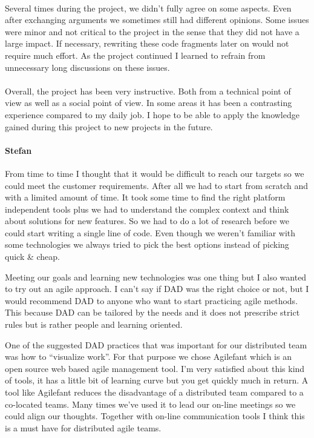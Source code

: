 \paragraph{}
Several times during the project, we didn't fully agree on some aspects.
Even after exchanging arguments we sometimes still had different opinions.
Some issues were minor and not critical to the project in the sense that
they did not have a large impact. If necessary, rewriting these code fragments
later on would not require much effort. As the project continued I
learned to refrain from unnecessary long discussions on these issues.



\paragraph{}
Overall, the project has been very instructive. Both from a technical point
of view as well as a social point of view. In some areas it has been a
contrasting experience compared to my daily job. I hope to be able to
apply the knowledge gained during this project to new projects in the future.




\paragraph{Stefan}
From time to time I thought that it would be difficult to reach our targets so
we could meet the customer requirements. After all we had to start from scratch
and with a limited amount of time. It took some time to find the right platform
independent tools plus we had to understand the complex context and think about
solutions for new features. So we had to do a lot of research before we could
start writing a single line of code. Even though we weren't familiar with some
technologies we always tried to pick the best options instead of picking quick
\& cheap.

Meeting our goals and learning new technologies was one thing but I also wanted
to try out an agile approach. I can't say if DAD was the right choice or not,
but I would recommend DAD to anyone who want to start practicing agile methods.
This because DAD can be tailored by the needs and it does not prescribe strict
rules but is rather people and learning oriented.

One of the suggested DAD practices that was important for our distributed team
was how to ``visualize work''. For that purpose we chose Agilefant which is an
open source web based agile management tool. I'm very satisfied about this kind
of tools, it has a little bit of learning curve but you get quickly much in
return. A tool like Agilefant reduces the disadvantage of a distributed team
compared to a co-located teams. Many times we've used it to lead our on-line
meetings so we could align our thoughts. Together with on-line communication
tools I think this is a must have for distributed agile teams.

